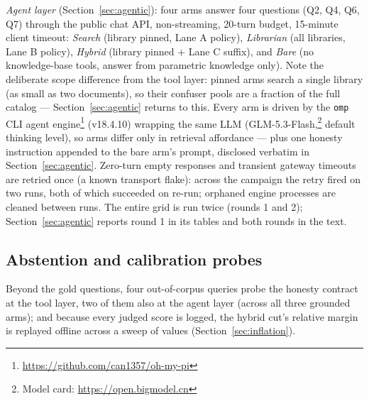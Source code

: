 \documentclass[preprint,12pt]{elsarticle}
\begin{document}
\emph{Agent layer} (Section~\ref{sec:agentic}): four arms answer four
questions (Q2, Q4, Q6, Q7) through the public chat API, non-streaming,
20-turn budget, 15-minute client timeout: \emph{Search} (library pinned,
Lane A policy), \emph{Librarian} (all libraries, Lane B policy),
\emph{Hybrid} (library pinned + Lane C suffix), and \emph{Bare} (no
knowledge-base tools, answer from parametric knowledge only). Note the
deliberate scope difference from the tool layer: pinned arms search a
single library (as small as two documents), so their confuser pools are a
fraction of the full catalog --- Section~\ref{sec:agentic} returns to this.
Every arm is
driven by the \texttt{omp} CLI agent engine\footnote{\url{https://github.com/can1357/oh-my-pi}}
(v18.4.10) wrapping the same
LLM (GLM-5.3-Flash,\footnote{Model card:
\url{https://open.bigmodel.cn}} default thinking level), so arms differ
only in retrieval affordance --- plus one honesty instruction appended to
the bare arm's prompt, disclosed verbatim in
Section~\ref{sec:agentic}. Zero-turn empty responses and transient
gateway timeouts are retried once (a known transport flake): across the
campaign the retry fired on two runs, both of which succeeded on re-run;
orphaned engine processes are cleaned between runs. The entire grid is run
twice (rounds 1 and 2); Section~\ref{sec:agentic} reports round 1 in its
tables and both rounds in the text.

\subsection{Abstention and calibration probes}
Beyond the gold questions, four out-of-corpus queries probe the honesty
contract at the tool layer, two of them also at the agent layer (across
all three grounded arms); and because every judged score is logged, the hybrid cut's relative margin is replayed offline across a
sweep of values (Section~\ref{sec:inflation}).
\end{document}
